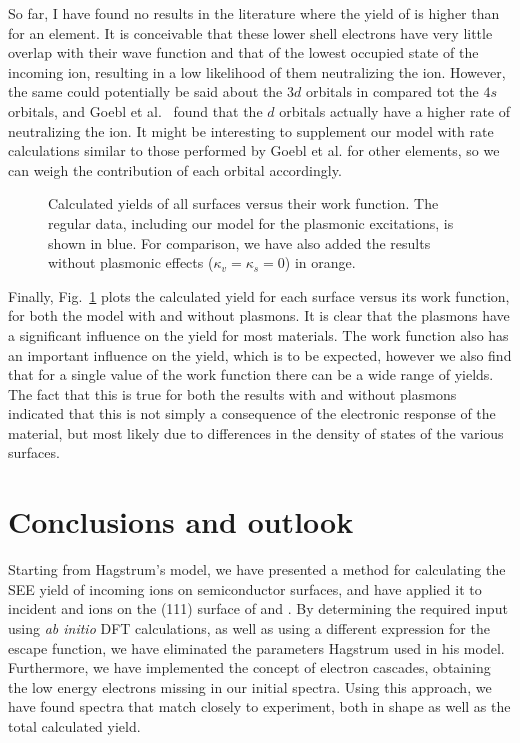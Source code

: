 \begin{refsection}
So far, I have found no results in the literature where the yield of  is higher than  for an element. It is conceivable that these lower shell electrons have very little overlap with their wave function and that of the lowest occupied state of the incoming ion, resulting in a low likelihood of them neutralizing the ion. However, the same could potentially be said about the $3d$ orbitals in  compared tot the $4s$ orbitals, and Goebl et al.~\cite{Goebl2011} found that the $d$ orbitals actually have a higher rate of neutralizing the ion. It might be interesting to supplement our model with rate calculations similar to those performed by Goebl et al. for other elements, so we can weigh the contribution of each orbital accordingly.

\begin{figure}[h]
\centering

\caption{Calculated yields of all surfaces versus their work function. The regular data, including our model for the plasmonic excitations, is shown in blue. For comparison, we have also added the results without plasmonic effects ($\kappa_v = \kappa_s = 0$) in orange.}
\label{quotas:fig-versus_workfun}
\end{figure}

Finally, Fig.~\ref{quotas:fig-versus_workfun} plots the calculated yield for each surface versus its work function, for both the model with and without plasmons. It is clear that the plasmons have a significant influence on the yield for most materials. The work function also has an important influence on the yield, which is to be expected, however we also find that for a single value of the work function there can be a wide range of yields. The fact that this is true for both the results with and without plasmons indicated that this is not simply a consequence of the electronic response of the material, but most likely due to differences in the density of states of the various surfaces.

\section{Conclusions and outlook}


Starting from Hagstrum's model, we have presented a method for calculating the SEE yield of incoming ions on semiconductor surfaces, and have applied it to incident  and  ions on the (111) surface of  and . By determining the required input using \textit{ab initio} DFT calculations, as well as using a different expression for the escape function, we have eliminated the parameters Hagstrum used in his model. Furthermore, we have implemented the concept of electron cascades, obtaining the low energy electrons missing in our initial spectra. Using this approach, we have found spectra that match closely to experiment, both in shape as well as the total calculated yield. \\


\end{refsection}

